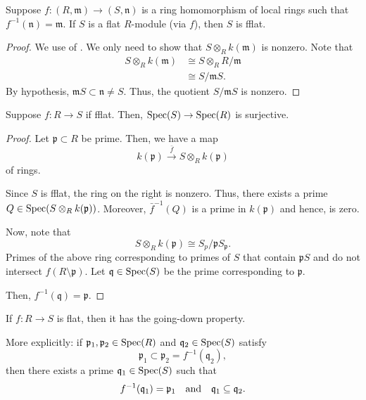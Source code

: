 \documentclass[12pt]{article}
\begin{document}
\begin{lem} \label{lem:local-flat-fflat}
	Suppose $f : (R, \mathfrak{m}) \to (S, \mathfrak{n})$ is a ring homomorphism of local rings such that $f^{-1}(\mathfrak{n}) = \mathfrak{m}$. \newline
	If $S$ is a flat $R$-module (via $f$), then $S$ is fflat.
\end{lem}
\begin{proof} 
	We use  of . We only need to show that $S \otimes_{R} k(\mathfrak{m})$ is nonzero. Note that
	\begin{align*} 
		S \otimes_{R} k(\mathfrak{m}) &\cong S \otimes_{R} R/\mathfrak{m} \\
		&\cong S/\mathfrak{m}S.
	\end{align*}
	By hypothesis, $\mathfrak{m} S \subset \mathfrak{n} \neq S$. Thus, the quotient $S/\mathfrak{m} S$ is nonzero.
\end{proof}

\begin{thm}
	Suppose $f : R \to S$ if fflat. Then, $\operatorname{Spec}(S) \to \operatorname{Spec}(R)$ is surjective.
\end{thm}
\begin{proof} 
	Let $\mathfrak{p} \subset R$ be prime. Then, we have a map
	\begin{equation*} 
		k(\mathfrak{p}) \xrightarrow{\bar{f}} S \otimes_{R} k(\mathfrak{p})
	\end{equation*}
	of rings. 

	Since $S$ is fflat, the ring on the right is nonzero. Thus, there exists a prime $Q \in \operatorname{Spec}(S \otimes_{R} k(\mathfrak{p}))$. Moreover, $\bar{f}^{-1}(Q)$ is a prime in $k(\mathfrak{p})$ and hence, is zero.

	Now, note that
	\begin{equation*} 
		S \otimes_{R} k(\mathfrak{p}) \cong S_{p}/\mathfrak{p} S_{\mathfrak{p}}.
	\end{equation*}
	Primes of the above ring corresponding to primes of $S$ that contain $\mathfrak{p} S$ and do not intersect $f(R \setminus \mathfrak{p})$. Let $\mathfrak{q} \in \operatorname{Spec}(S)$ be the prime corresponding to $\mathfrak{p}$. 

	Then, $f^{-1}(\mathfrak{q}) = \mathfrak{p}$.	
\end{proof}

\begin{thm}
	If $f : R \to S$ is flat, then it has the going-down property.

	More explicitly: if $\mathfrak{p}_{1}, \mathfrak{p}_{2} \in \operatorname{Spec}(R)$ and $\mathfrak{q}_{2} \in \operatorname{Spec}(S)$ satisfy
	\begin{equation*} 
		\mathfrak{p}_{1} \subset \mathfrak{p}_{2} = f^{-1}(\mathfrak{q}_{2}),
	\end{equation*}
	then there exists a prime $\mathfrak{q}_{1} \in \operatorname{Spec}(S)$ such that 
	\begin{equation*} 
		f^{-1}(\mathfrak{q}_{1}) = \mathfrak{p}_{1} \quad\text{and}\quad \mathfrak{q}_{1} \subseteq \mathfrak{q}_{2}.
	\end{equation*}
\end{thm}
\end{document}
